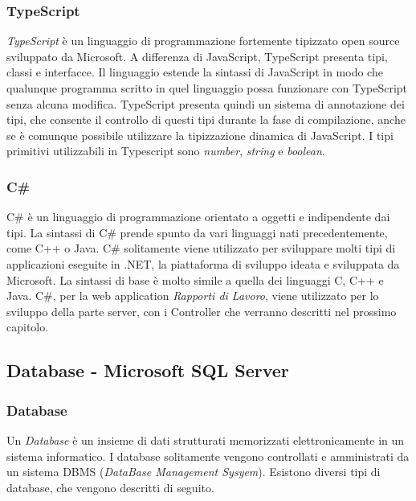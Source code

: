   \subsubsection{TypeScript}
  \textit{TypeScript} è un linguaggio di programmazione fortemente tipizzato open source sviluppato da Microsoft. A differenza
  di JavaScript, TypeScript presenta tipi, classi e interfacce. Il linguaggio estende la sintassi di JavaScript in modo che
  qualunque programma scritto in quel linguaggio possa funzionare con TypeScript senza alcuna modifica. TypeScript presenta quindi
  un sistema di annotazione dei tipi, che consente il controllo di questi tipi durante la fase di compilazione, anche se è comunque
  possibile utilizzare la tipizzazione dinamica di JavaScript. I tipi primitivi utilizzabili in Typescript sono \textit{number},
  \textit{string} e \textit{boolean}.

  \subsubsection{C\#}
  C\# è un linguaggio di programmazione orientato a oggetti e indipendente dai tipi. La sintassi di C\# prende spunto da
  vari linguaggi nati precedentemente, come C++ o Java.  C\# solitamente viene utilizzato per sviluppare molti tipi di applicazioni
  eseguite in .NET, la piattaforma di sviluppo ideata e sviluppata da Microsoft. La sintassi di base è molto simile
  a quella dei linguaggi C, C++ e Java.  
  C\#, per la web application \textit{Rapporti di Lavoro}, viene utilizzato per lo sviluppo della parte server, con i 
  Controller che verranno descritti nel prossimo capitolo.

  \subsection{Database - Microsoft SQL Server}
  \subsubsection{Database}
  Un \textit{Database} è un insieme di dati strutturati memorizzati elettronicamente in un sistema informatico.
  I database solitamente vengono controllati e amministrati da un sistema DBMS (\textit{DataBase Management Sysyem}). 
  Esistono diversi tipi di database, che vengono descritti di seguito.
